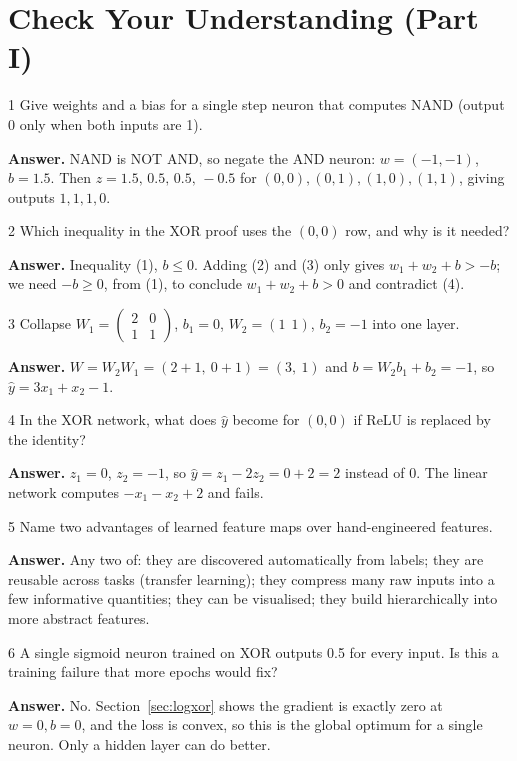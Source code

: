 \documentclass[11pt]{article}
\begin{document}
\section{Check Your Understanding (Part I)}
\begin{question}{1}
Give weights and a bias for a single step neuron that computes NAND (output 0 only when both inputs are 1).
\end{question}
\textbf{Answer.} NAND is NOT AND, so negate the AND neuron: $w=(-1,-1)$, $b=1.5$. Then $z=1.5,\,0.5,\,0.5,\,-0.5$ for $(0,0),(0,1),(1,0),(1,1)$, giving outputs $1,1,1,0$.

\begin{question}{2}
Which inequality in the XOR proof uses the $(0,0)$ row, and why is it needed?
\end{question}
\textbf{Answer.} Inequality (1), $b\le0$. Adding (2) and (3) only gives $w_1+w_2+b>-b$; we need $-b\ge0$, from (1), to conclude $w_1+w_2+b>0$ and contradict (4).

\begin{question}{3}
Collapse $W_1=\begin{pmatrix}2&0\\1&1\end{pmatrix}$, $b_1=0$, $W_2=(1\ \ 1)$, $b_2=-1$ into one layer.
\end{question}
\textbf{Answer.} $W=W_2W_1=(2+1,\ 0+1)=(3,\ 1)$ and $b=W_2b_1+b_2=-1$, so $\hat y=3x_1+x_2-1$.

\begin{question}{4}
In the XOR network, what does $\hat y$ become for $(0,0)$ if ReLU is replaced by the identity?
\end{question}
\textbf{Answer.} $z_1=0$, $z_2=-1$, so $\hat y=z_1-2z_2=0+2=2$ instead of 0. The linear network computes $-x_1-x_2+2$ and fails.

\begin{question}{5}
Name two advantages of learned feature maps over hand-engineered features.
\end{question}
\textbf{Answer.} Any two of: they are discovered automatically from labels; they are reusable across tasks (transfer learning); they compress many raw inputs into a few informative quantities; they can be visualised; they build hierarchically into more abstract features.

\begin{question}{6}
A single sigmoid neuron trained on XOR outputs 0.5 for every input. Is this a training failure that more epochs would fix?
\end{question}
\textbf{Answer.} No. Section~\ref{sec:logxor} shows the gradient is exactly zero at $w=0,b=0$, and the loss is convex, so this is the global optimum for a single neuron. Only a hidden layer can do better.
\end{document}
